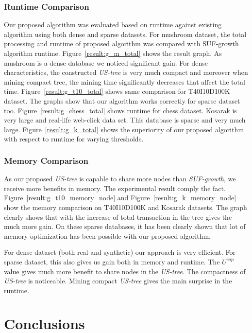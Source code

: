 \documentclass[10pt, conference, compsocconf]{IEEEtran}
\begin{document}
\subsubsection{Runtime Comparison}

Our proposed algorithm was evaluated based on runtime against existing algorithm using both dense and sparse datasets. For mushroom dataset, the total processing and runtime of proposed algorithm was compared with SUF-growth~\cite{DBLP:conf/icde/LeungH09} algorithm runtime. Figure~\ref{result:g_m_total} shows the result graph. As mushroom is a dense database we noticed significant gain. For dense characteristics, the constructed \emph{US-tree} is very much compact and moreover when mining compact tree, the mining time significantly decreases that affect the total time. Figure~\ref{result:g_t10_total} shows same comparison for T40I10D100K dataset. The graphs show that our algorithm works correctly for sparse dataset too. Figure~\ref{result:g_chess_total} shows runtime for chess dataset. Kosarak is very large and real-life web-click data set. This database is sparse and very much large. Figure~\ref{result:g_k_total} shows the superiority of our proposed algorithm with respect to runtime for varying thresholds.    

\subsubsection{Memory Comparison}

As our proposed \emph{US-tree} is capable to share more nodes than \emph{SUF-growth}, we receive more benefits in memory. The experimental result comply the fact. Figure~\ref{result:g_t10_memory_node} and Figure~\ref{result:g_k_memory_node} show the memory comparison on T40I10D100K and Kosarak datasets. The graph clearly shows that with the increase of total transaction in the tree gives the much more gain. On these sparse databases, it has been clearly shown that lot of memory optimization has been possible with our proposed algorithm.

For dense dataset (both real and synthetic) our approach is very efficient. For sparse dataset, this also gives us gain both in memory and runtime. The $U^{cap}$ value gives much more benefit to share nodes in the \emph{US-tree}. The compactness of \emph{US-tree} is noticeable. Mining compact \emph{US-tree} gives the main surprise in the runtime.

\section{Conclusions}\label{Conclusion}
\end{document}
